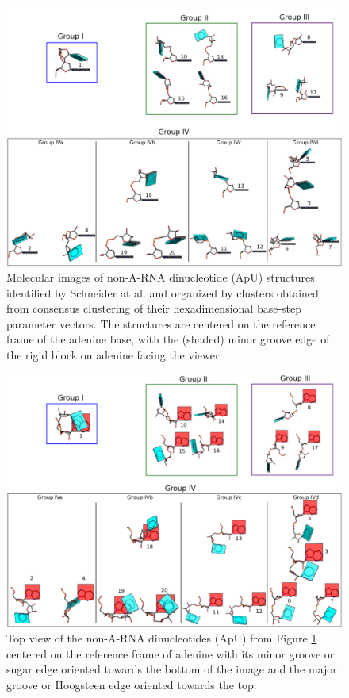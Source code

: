 \begin{figure}[htbp]
 \centering
\includegraphics[angle=90, scale=0.43]{Chapter2/collageb.png}
 \caption{Molecular images of  non-A-RNA dinucleotide (ApU) structures
   identified by  Schneider at al.  \cite{schneider2004} and organized
   by   clusters   obtained  from   consensus   clustering  of   their
   hexadimensional  base-step parameter  vectors.  The  structures are
   centered  on the  reference frame  of  the adenine  base, with  the
   (shaded) minor groove edge of the rigid block on adenine facing the
   viewer.}
 \label{fig:nonAclus}
\end{figure}

\begin{figure}
\centering
\includegraphics[angle=90, scale=0.48]{Chapter2/collage2.png}
\caption{Top  view of  the non-A-RNA  dinucleotides (ApU)  from Figure
  \ref{fig:nonAclus} centered  on the reference frame  of adenine with
  its minor  groove or sugar \cite{leontis1998}  edge oriented towards
  the  bottom  of  the  image   and  the  major  groove  or  Hoogsteen
  \cite{leontis1998} edge oriented towards the top.}
\label{fig:steps2}
\end{figure}

